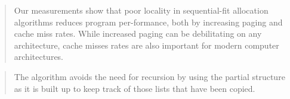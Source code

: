 \documentclass[a4paper,oneside]{memoir}
\begin{document}
\blockquote{Our measurements show that poor locality in sequential-fit
allocation algorithms reduces program per-formance, both by increasing paging
and cache miss rates. While increased paging can be debilitating on any
architecture, cache misses rates are also important for modern computer
architectures. \cite{Grunwald:1993}}

\blockquote{The algorithm avoids the need for recursion by using the partial
structure as it is built up to keep track of those lists that have been copied.}
\cite{Cheney:1970}




%
\end{document}
